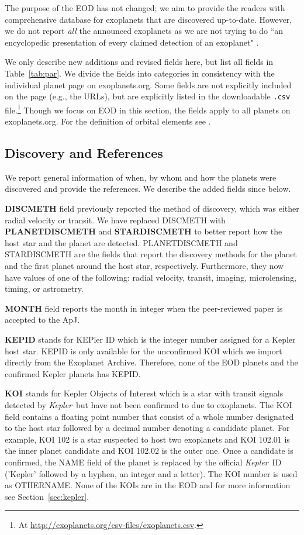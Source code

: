 \documentclass[11pt,preprint]{aastex}
\def\kepler{\textit{Kepler}}
\begin{document}
\begin{CJK*}{UTF8}{gbsn}
The purpose of the EOD has not changed; we aim to provide the readers with comprehensive database for exoplanets that are discovered up-to-date. However, we do not report \textit{all} the announced exoplanets as we are not trying to do ``an encyclopedic presentation of every claimed detection of an exoplanet" \citep{Wright2011}.

We only describe new additions and revised fields here, but list all
fields in Table~\ref{tab:par}. We divide the fields into categories in consistency with the individual planet page
on exoplanets.org. Some fields are not explicitly included on the page (e.g., the URLs), but are explicitly listed in the downloadable {\tt .csv} file.\footnote{At \url{http://exoplanets.org/csv-files/exoplanets.csv}.} Though we focus on EOD in this section, the fields apply to all planets on exoplanets.org. For the definition of orbital elements see \cite{Wright2013} . 
\subsection{Discovery and References}\label{sec:disc}

We report general information of when, by whom and how the planets
were discovered and provide the references. We describe the added
fields since \cite{Wright2011} below.

{\bf DISCMETH} field previously reported the method of discovery,
which was either radial velocity or transit. We have replaced DISCMETH
with {\bf PLANETDISCMETH} and \mbox{{\bf STARDISCMETH}} to better report how
the host star and the planet are detected. PLANETDISCMETH and STARDISCMETH are the fields that report the discovery methods for the planet and the first planet around the host star, respectively. Furthermore, they now have values of one of the following: radial velocity, transit, imaging,
microlensing, timing, or astrometry.

{\bf MONTH} field reports the month in integer when the
peer-reviewed paper is accepted to the ApJ. 

{\bf KEPID} stands for KEPler ID which is the integer number assigned
for a Kepler host star. KEPID is only available for the unconfirmed
KOI which we import directly from the Exoplanet Archive. Therefore,
none of the EOD planets and the confirmed Kepler planets has KEPID.

{\bf KOI} stands for Kepler Objects of Interest which is a star with
transit signals detected by \kepler\ but have not been confirmed to
due to exoplanets. The KOI field contains a floating point number that
consist of a whole number designated to the host star followed by a
decimal number denoting a candidate planet. For example, KOI 102 is a
star suspected to host two exoplanets and KOI 102.01 is the inner
planet candidate and KOI 102.02 is the outer one. Once a candidate is
confirmed, the NAME field of the planet is replaced by the official
\kepler\ ID ('Kepler' followed by a hyphen, an integer and a
letter). The KOI number is used as OTHERNAME. None of the KOIs are in
the EOD and for more information see Section~\ref{sec:kepler}.


\end{CJK*}
\end{document}
